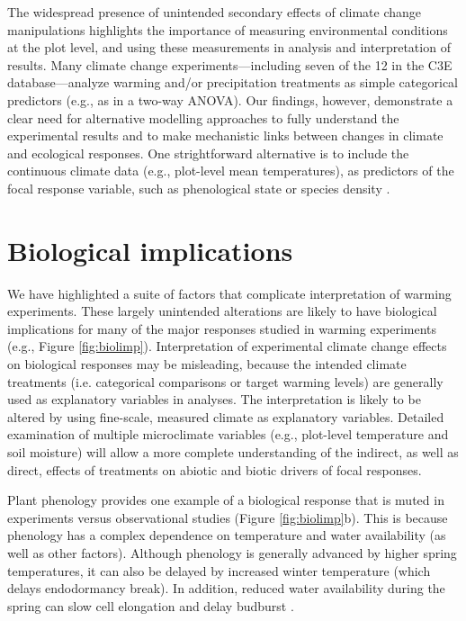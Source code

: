 \documentclass{article}
\begin{document}
\par The widespread presence of unintended secondary effects of climate change manipulations highlights the importance of measuring environmental conditions at the plot level, and using these measurements in analysis and interpretation of results. Many climate change experiments---including seven of the 12 in the C3E database---analyze warming and/or precipitation treatments as simple categorical predictors (e.g., as in a two-way ANOVA). Our findings, however, demonstrate a clear need for alternative modelling approaches to fully understand the experimental results and to make mechanistic links between changes in climate and ecological responses. One strightforward alternative is to include the continuous climate data (e.g., plot-level mean temperatures), as predictors of the focal response variable, such as phenological state or species density \citep [e.g.,][]{marchin2015, pelini2014}. 

\section* {Biological implications}

\par We have highlighted a suite of factors that complicate interpretation of warming experiments. These largely unintended alterations are likely to have biological implications for many of the major responses studied in warming experiments (e.g., Figure \ref{fig:biolimp}). Interpretation of experimental climate change effects on biological responses may be misleading, because the intended climate treatments (i.e. categorical comparisons or target warming levels) are generally used as explanatory variables in analyses. The interpretation is likely to be altered by using fine-scale, measured climate as explanatory variables. Detailed examination of multiple microclimate variables (e.g., plot-level temperature and soil moisture) will allow a more complete understanding of the indirect, as well as direct, effects of treatments on abiotic and biotic drivers of focal responses.

\par Plant phenology provides one example of a biological response that is muted in experiments versus observational studies (Figure \ref{fig:biolimp}b). This is because phenology has a complex dependence on temperature and water availability (as well as other factors). Although phenology is generally advanced by higher spring temperatures, it can also be delayed by increased winter temperature (which delays endodormancy break). In addition, reduced water availability during the spring can slow cell elongation and delay budburst \citep{penuelas2004,ourcival2011,craine2012,matthews2016}.
\end{document}
